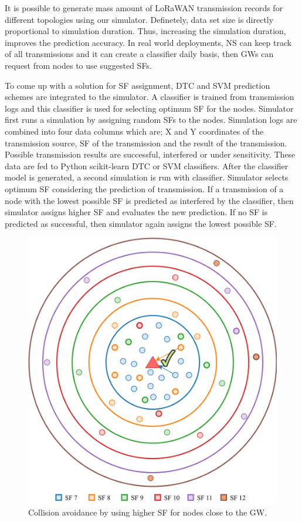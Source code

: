 \documentclass[conference]{IEEEtran}
\begin{document}
\par It is possible to generate mass amount of LoRaWAN transmission records for different topologies using our simulator. Definetely, data set size is directly proportional to simulation duration. Thus, increasing the simulation duration, improves the prediction accuracy. In real world deployments, NS can keep track of all transmissions and it can create a classifier daily basis, then GWs can request from nodes to use suggested SFs.

\par To come up with a solution for SF assignment, DTC and SVM prediction schemes are integrated to the simulator. A classifier is trained from transmission logs and this classifier is used for selecting optimum SF for the nodes. Simulator first runs a simulation by assigning random SFs to the nodes. Simulation logs are combined into four data columns which are; X and Y coordinates of the transmission source, SF of the transmission and the result of the transmission. Possible transmission results are successful, interfered or under sensitivity. These data are fed to Python scikit-learn DTC or SVM classifiers. After the classifier model is generated, a second simulation is run with classifier. Simulator selects optimum SF considering the prediction of transmission. If a transmission of a node with the lowest possible SF is predicted as interfered by the classifier, then simulator assigns higher SF and evaluates the new prediction. If no SF is predicted as successful, then simulator again assigns the lowest possible SF.

\begin{figure}
\centering
\includegraphics[width=\linewidth]{collision_solution_single_gw}
\caption{Collision avoidance by using higher SF for nodes close to the GW.}
\label{fig:collision_solution_single_gw}
\end{figure}
\end{document}
